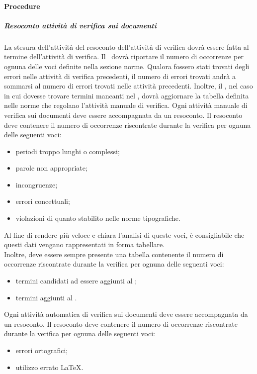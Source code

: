 \documentclass[../NormeProgetto.text]{subfiles}
\begin{document}
		\paragraph{Procedure}
		\subparagraph{Resoconto attività di verifica sui documenti}	
				La stesura dell'attività del resoconto dell'attività di verifica dovrà essere fatta al termine dell'attività di verifica. Il \verificatore\ dovrà riportare il numero di occorrenze per ognuna delle voci definite nella sezione norme. Qualora fossero stati trovati degli errori nelle attività di verifica precedenti, il numero di errori trovati andrà a sommarsi al numero di errori trovati nelle attività precedenti.
				Inoltre, il \verificatore, nel caso in cui dovesse trovare termini mancanti nel \glossario, dovrà aggiornare la tabella definita nelle norme che regolano l'attività manuale di verifica.
			Ogni attività manuale di verifica sui documenti deve essere accompagnata da un resoconto. Il resoconto deve contenere il numero di occorrenze riscontrate durante la verifica per ognuna delle seguenti voci:
			\begin{itemize}
				\item periodi troppo lunghi o complessi;
				\item parole non appropriate;
				\item incongruenze;
				\item errori concettuali;
				\item violazioni di quanto stabilito nelle norme tipografiche.		
			\end{itemize}
			Al fine di rendere più veloce e chiara l'analisi di queste voci, è consigliabile che questi dati vengano rappresentati in forma tabellare.\\
			Inoltre, deve essere sempre presente una tabella contenente il numero di occorrenze riscontrate durante la verifica per ognuna delle seguenti voci:
				\begin{itemize}
					\item termini candidati ad essere aggiunti al \glossario;
					\item termini aggiunti al \glossario.
				\end{itemize}
				Ogni attività automatica di verifica sui documenti deve essere accompagnata da un resoconto. Il resoconto deve contenere il numero di occorrenze riscontrate durante la verifica per ognuna delle seguenti voci:
				\begin{itemize}
				\item errori ortografici;
				\item utilizzo errato \LaTeX\g.
				\end{itemize}
			
\end{document}
